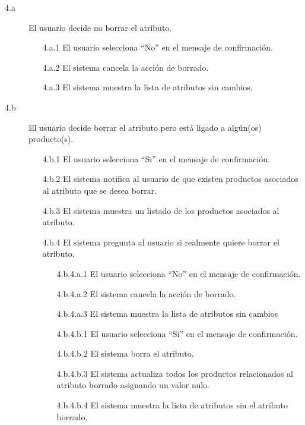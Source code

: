 \begin{description}

    \item[4.a] El usuario decide no borrar el atributo.
    \begin{enumerate}
        \item[4.a.1] El usuario selecciona \enquote{No} en el mensaje de confirmación.
        \item[4.a.2] El sistema cancela la acción de borrado.
        \item[4.a.3] El sistema muestra la lista de atributos sin cambios.  
    \end{enumerate}
    \item[4.b] El usuario decide borrar el atributo pero está ligado a algún(os) producto(s).
    \begin{enumerate}
        \item[4.b.1] El usuario selecciona \enquote{Si} en el mensaje de confirmación.
        \item[4.b.2] El sistema notifica al usuario de que existen productos asociados al atributo que se desea borrar.
        \item[4.b.3] El sistema muestra un listado de los productos asociados al atributo.
        \item[4.b.4] El sistema pregunta al usuario si realmente quiere borrar el atributo.
        \begin{enumerate}
            \item[4.b.4.a.1] El usuario selecciona \enquote{No} en el mensaje de confirmación.
            \item[4.b.4.a.2] El sistema cancela la acción de borrado.
            \item[4.b.4.a.3] El sistema muestra la lista de atributos sin cambios 
        \end{enumerate}
        \begin{enumerate}
            \item[4.b.4.b.1] El usuario selecciona \enquote{Si} en el mensaje de confirmación.
            \item[4.b.4.b.2] El sistema borra el atributo. 
            \item[4.b.4.b.3] El sistema actualiza todos los productos relacionados al atributo borrado asignando un valor nulo. 
            \item[4.b.4.b.4] El sistema muestra la lista de atributos sin el atributo borrado.
        \end{enumerate} 
    \end{enumerate}
\end{description}

